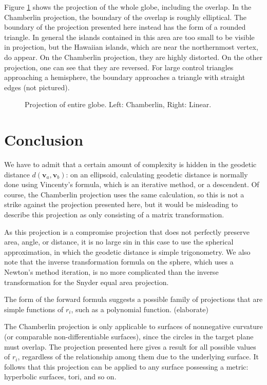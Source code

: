 \documentclass{amsart}[12pt]
\begin{document}
Figure \ref{fig:globeproj} shows the projection of the whole globe, including
the overlap.
In the Chamberlin projection, the boundary of the overlap is roughly elliptical.
The boundary of the projection presented here instead has the form of a
rounded triangle. In general the islands contained in this area are too small
to be visible in projection, but the Hawaiian islands, which are near the
northernmost vertex, do appear. On the Chamberlin projection, they are highly
distorted. On the other projection, one can see that they are reversed.
For large control triangles approaching a hemisphere, the
boundary approaches a triangle with straight edges (not pictured).

\begin{figure}%

\caption{Projection of entire globe. Left: Chamberlin, Right: Linear. }
\label{fig:globeproj}
\end{figure}

\section{Conclusion}
We have to admit that a certain amount of complexity is hidden in the geodetic
distance $d(\mathbf v_a, \mathbf v_b)$: on an ellipsoid, calculating geodetic
distance is normally done using Vincenty's formula, which is an iterative
method, or a descendent.\cite{proj} Of course, the Chamberlin projection
uses the same calculation, so this is not a strike against the projection
presented here, but it would be misleading to describe this projection as only
consisting of a matrix transformation.

As this projection is a compromise projection that does not perfectly
preserve area, angle, or distance, it is no large sin in this case to use the
spherical approximation, in which the geodetic distance is simple trigonometry.
We also note that the inverse transformation formula on the sphere, which
uses a Newton's method iteration, is no more complicated than the inverse
transformation for the Snyder equal area projection. \cite{snyder92}

The form of the forward formula suggests a possible family of projections that
are simple functions of $r_i$, such as a polynomial function. (elaborate)

The Chamberlin projection is only applicable to surfaces of nonnegative
curvature (or comparable non-differentiable surfaces), since the circles in the
target plane must overlap. The projection presented here gives a result for all
possible values of $r_i$, regardless of the relationship among them due to the
underlying surface. It follows that this projection can be applied to any
surface possessing a metric: hyperbolic surfaces, tori, and so on.



\end{document}
